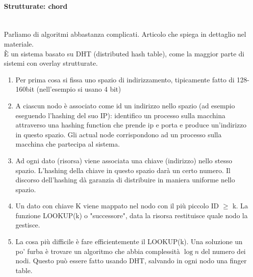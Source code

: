\paragraph{Strutturate: chord}
\mbox{}\\Parliamo di algoritmi abbastanza complicati. Articolo che spiega in dettaglio nel materiale. \\
È un sistema basato su DHT (distributed hash table), come la maggior parte di sistemi con overlay strutturate.\\
\begin{enumerate}
    \item Per prima cosa si fissa uno spazio di indirizzamento, tipicamente fatto di 128-160bit (nell'esempio si usano 4 bit)
    \item A ciascun nodo è associato come id un indirizzo nello spazio (ad esempio eseguendo l'hashing del suo IP): identifico un processo sulla macchina attraverso una hashing function che prende ip e porta e produce un'indirizzo in questo spazio. Gli actual node corrispondono ad un processo sulla macchina che partecipa al sistema.
    \item Ad ogni dato (risorsa) viene associata una chiave (indirizzo) nello stesso spazio. L'hashing della chiave in questo spazio darà un certo numero. Il discorso dell'hashing dà garanzia di distribuire in maniera uniforme nello spazio. 
    \item Un dato con chiave K viene mappato nel nodo con il più piccolo ID \(\geq\) k. La funzione LOOKUP(k) o "successore", data la risorsa restituisce quale nodo la gestisce. 
    \item La cosa più difficile è fare efficientemente il LOOKUP(k). Una soluzione un po' furba è trovare un algoritmo che abbia complessità \(\log n\) del numero dei nodi. Questo può essere fatto usando DHT, salvando in ogni nodo una finger table.\\
\end{enumerate}
 
